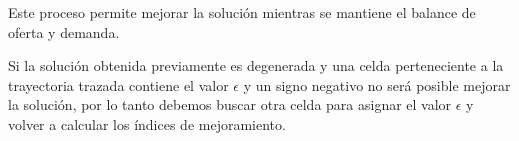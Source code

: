 	
	Este proceso permite mejorar la solución mientras se mantiene el balance de oferta y demanda.
	
	Si la solución obtenida previamente es degenerada y una celda perteneciente a la trayectoria trazada contiene el valor $\epsilon$ y un signo negativo no será posible mejorar la solución, por lo tanto debemos buscar otra celda para asignar el valor $\epsilon$ y volver a calcular los índices de mejoramiento.
	
	
